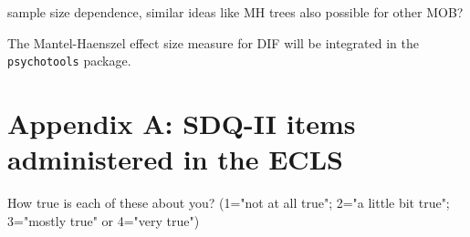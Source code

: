 \documentclass[doc,floatsintext,natbib]{apa7}
\begin{document}

sample size dependence, similar ideas like MH trees also possible for other MOB?

The Mantel-Haenszel effect size measure for DIF will be integrated in the \texttt{psychotools} package. 






\newpage
\appendix



\section{Appendix A: SDQ-II items administered in the ECLS}
\label{sec:AppendixA}


How true is each of these about you? (1="not at all true"; 2="a little bit true"; 3="mostly true" or 4="very true")
\end{document}
